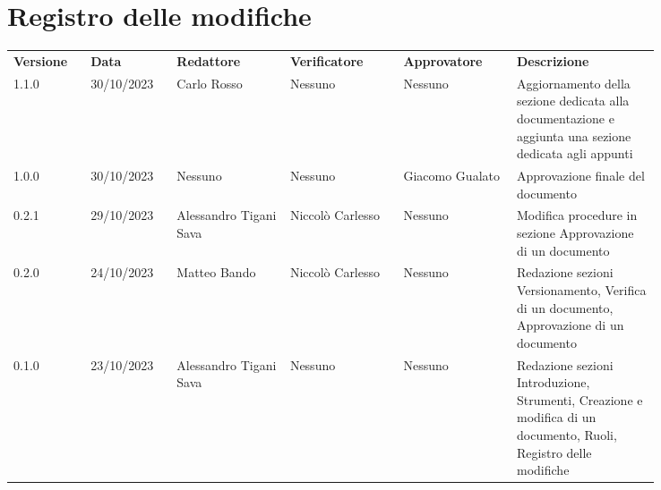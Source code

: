 \section*{Registro delle modifiche}
 {
  \scriptsize
  \begin{tabular}{p{0.10\linewidth}p{0.10\linewidth}p{0.15\linewidth}p{0.15\linewidth}p{0.15\linewidth}p{0.19\linewidth}}
	  \textbf{Versione} & \textbf{Data} & \textbf{Redattore}     & \textbf{Verificatore} & \textbf{Approvatore} & \textbf{Descrizione}                                                                                             \\
	  1.1.0             & 30/10/2023    & Carlo Rosso            & Nessuno               & Nessuno              & Aggiornamento della sezione dedicata alla documentazione e aggiunta una sezione dedicata agli appunti            \\
	  \hline
	  1.0.0             & 30/10/2023    & Nessuno                & Nessuno               & Giacomo Gualato      & Approvazione finale del documento                                                                                \\
	  \hline
	  0.2.1             & 29/10/2023    & Alessandro Tigani Sava & Niccolò Carlesso      & Nessuno              & Modifica procedure in sezione Approvazione di un documento                                                       \\
	  \hline
	  0.2.0             & 24/10/2023    & Matteo Bando           & Niccolò Carlesso      & Nessuno              & Redazione sezioni Versionamento, Verifica di un documento, Approvazione di un documento                          \\
	  \hline
	  0.1.0             & 23/10/2023    & Alessandro Tigani Sava & Nessuno               & Nessuno              & Redazione sezioni Introduzione, Strumenti, Creazione e modifica di un documento, Ruoli, Registro delle modifiche \\
	  \hline
  \end{tabular}
 }
